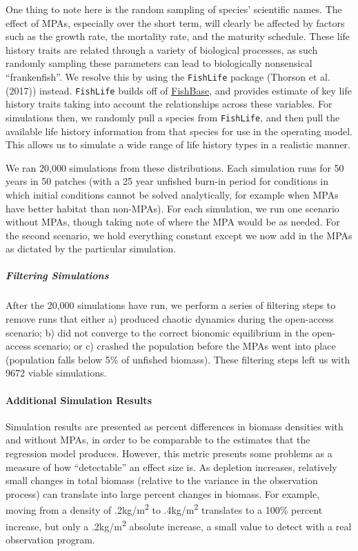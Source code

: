 \documentclass[]{article}
\let\oldparagraph\paragraph
\renewcommand{\paragraph}[1]{\oldparagraph{#1}\mbox{}}
\let\oldsubparagraph\subparagraph
\renewcommand{\subparagraph}[1]{\oldsubparagraph{#1}\mbox{}}
\begin{document}
One thing to note here is the random sampling of species' scientific names. The effect of MPAs, especially over the short term, will clearly be affected by factors such as the growth rate, the mortality rate, and the maturity schedule. These life history traits are related through a variety of biological processes, as such randomly sampling these parameters can lead to biologically nonsensical ``frankenfish''. We resolve this by using the \texttt{FishLife} package (Thorson et al. (2017)) instead. \texttt{FishLife} builds off of \href{https://fishbase.org/}{FishBase}, and provides estimate of key life history traits taking into account the relationships across these variables. For simulations then, we randomly pull a species from \texttt{FishLife}, and then pull the available life history information from that species for use in the operating model. This allows us to simulate a wide range of life history types in a realistic manner.

We ran 20,000 simulations from these distributions. Each simulation runs for 50 years in 50 patches (with a 25 year unfished burn-in period for conditions in which initial conditions cannot be solved analytically, for example when MPAs have better habitat than non-MPAs). For each simulation, we run one scenario without MPAs, though taking note of where the MPA would be as needed. For the second scenario, we hold everything constant except we now add in the MPAs as dictated by the particular simulation.

\hypertarget{filtering-simulations}{%
\subparagraph{Filtering Simulations}\label{filtering-simulations}}

After the 20,000 simulations have run, we perform a series of filtering steps to remove runs that either a) produced chaotic dynamics during the open-access scenario; b) did not converge to the correct bionomic equilibrium in the open-access scenario; or c) crashed the population before the MPAs went into place (population falls below 5\% of unfished biomass). These filtering steps left us with 9672 viable simulations.

\hypertarget{additional-simulation-results}{%
\paragraph{Additional Simulation Results}\label{additional-simulation-results}}

Simulation results are presented as percent differences in biomass densities with and without MPAs, in order to be comparable to the estimates that the regression model produces. However, this metric presents some problems as a measure of how ``detectable'' an effect size is. As depletion increases, relatively small changes in total biomass (relative to the variance in the observation process) can translate into large percent changes in biomass. For example, moving from a density of .2kg/m\textsuperscript{2} to .4kg/m\textsuperscript{2} translates to a 100\% percent increase, but only a .2kg/m\textsuperscript{2} absolute increase, a small value to detect with a real observation program.
\end{document}

